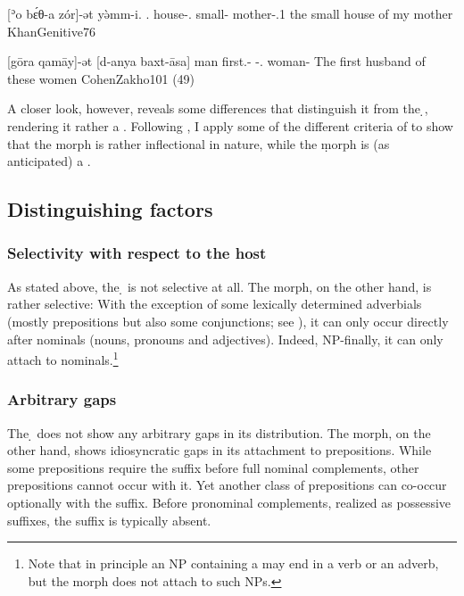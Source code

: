 {[ʾo\cb{} bɛ́θ-a zór]-ət yə̀mm-i.}
{.\masc\cb{} house-\free.\sg{} small-\cst{} mother-\poss.1\sg}
{the small house of my mother}
{KhanGenitive}{76}

{[gōra qamāy]-ət [d-anya baxt-āsa]}
{man first.\masc-\cst{} \gen-\dem.\pl{} woman-\pl}
{The first husband of these women}
{CohenZakho}{101 (49)}


A closer look, however, reveals some differences that distinguish it from the \d {}, rendering it rather a . Following \citet{SamvelianEzafe}, I apply some of the different criteria of \citet{ZwickyPullum} to show that the \ed morph is rather inflectional in nature, while the \d morph is (as anticipated) a . 

\subsection{Distinguishing factors}

\subsubsection{Selectivity with respect to the host}

As stated above, the \d {} is not selective at all. The \ed morph, on the other hand, is rather selective: With the exception of some lexically determined adverbials (mostly prepositions but also some conjunctions; see ), it can only occur directly after nominals (nouns, pronouns and adjectives). Indeed, NP-finally, it can only attach to nominals.\footnote{Note that in principle an NP containing a  may end in a verb or an adverb, but the \ed morph does not attach to such NPs.}

\largerpage
\subsubsection{Arbitrary gaps}

The \d {} does not show any arbitrary gaps in its distribution. The \ed morph, on the other hand, shows idiosyncratic gaps in its attachment to prepositions. While some prepositions require the \ed suffix before full nominal complements, other prepositions cannot occur with it. Yet another class of prepositions can co-occur optionally with the \ed suffix. Before pronominal complements, realized as possessive suffixes, the \ed suffix is typically absent.

